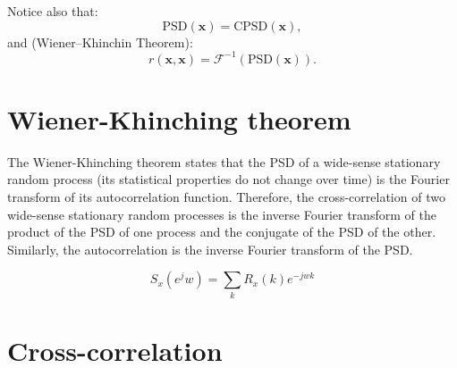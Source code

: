 Notice also that:
\begin{equation}
  \text{PSD}(\mathbf{x}) = \text{CPSD}(\mathbf{x}),
\end{equation}
and (Wiener–Khinchin Theorem):
\begin{equation}
  r(\mathbf{x},\mathbf{x}) = \mathcal{F}^{-1}(\text{PSD}(\mathbf{x})).
\end{equation}


\begin{comment}
\section{Energy Spectral Density (ESD)}

The ESD of a signal describes the distribution of the
energy\footnote{That obviously must be finite.} of the signal over
their frequency components. For a discrete-time signal $\mathbf{x}$,
the $\text{ESD}(\mathbf{x})$ is defined as
\begin{equation}
  \text{ESD}(\mathbf{x})=|\mathbf{X}|^2=\mathbf{X}\mathbf{X}^*,
\end{equation}
where $\mathbf{X}$ the DFT of $\mathbf{x}$, and $\mathbf{X}^*$ is its
complex conjugate.

\end{comment}

\section{Wiener-Khinching theorem}
\label{sec:WKT}

The Wiener-Khinching theorem states that the \gls{PSD} of a wide-sense
stationary random process (its statistical properties do not change
over time) is the Fourier transform of its autocorrelation
function. Therefore, the cross-correlation of two wide-sense
stationary random processes is the inverse Fourier transform of the
product of the \gls{PSD} of one process and the conjugate
of the \gls{PSD} of the other. Similarly, the
autocorrelation is the inverse Fourier transform of the \gls{PSD}.

\begin{equation}
  S_x(e^jw)=\sum_kR_x(k)e^{-jwk}
\end{equation}


\section{Cross-correlation}
\label{sec:cross-correlation}

